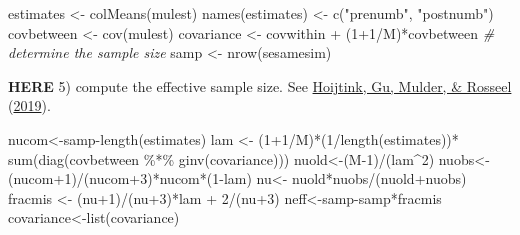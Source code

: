 \documentclass[
]{book}
\newenvironment{Shaded}{\begin{snugshade}}{\end{snugshade}}
\newcommand{\CommentTok}[1]{\textcolor[rgb]{0.56,0.35,0.01}{\textit{#1}}}
\newcommand{\DecValTok}[1]{\textcolor[rgb]{0.00,0.00,0.81}{#1}}
\newcommand{\FunctionTok}[1]{\textcolor[rgb]{0.00,0.00,0.00}{#1}}
\newcommand{\NormalTok}[1]{#1}
\newcommand{\OtherTok}[1]{\textcolor[rgb]{0.56,0.35,0.01}{#1}}
\newcommand{\SpecialCharTok}[1]{\textcolor[rgb]{0.00,0.00,0.00}{#1}}
\newcommand{\StringTok}[1]{\textcolor[rgb]{0.31,0.60,0.02}{#1}}
\begin{document}
\begin{Shaded}
\begin{Highlighting}[]
\NormalTok{estimates }\OtherTok{\textless{}{-}} \FunctionTok{colMeans}\NormalTok{(mulest)}
\FunctionTok{names}\NormalTok{(estimates) }\OtherTok{\textless{}{-}} \FunctionTok{c}\NormalTok{(}\StringTok{"prenumb"}\NormalTok{, }\StringTok{"postnumb"}\NormalTok{)}
\NormalTok{covbetween }\OtherTok{\textless{}{-}} \FunctionTok{cov}\NormalTok{(mulest)}
\NormalTok{covariance }\OtherTok{\textless{}{-}}\NormalTok{ covwithin }\SpecialCharTok{+}\NormalTok{ (}\DecValTok{1}\SpecialCharTok{+}\DecValTok{1}\SpecialCharTok{/}\NormalTok{M)}\SpecialCharTok{*}\NormalTok{covbetween}
\CommentTok{\# determine the sample size}
\NormalTok{samp }\OtherTok{\textless{}{-}} \FunctionTok{nrow}\NormalTok{(sesamesim)}
\end{Highlighting}
\end{Shaded}

\textbf{HERE}
5) compute the effective sample size. See \protect\hyperlink{ref-hoijtink2019computing}{Hoijtink, Gu, Mulder, \& Rosseel} (\protect\hyperlink{ref-hoijtink2019computing}{2019}).

\begin{Shaded}
\begin{Highlighting}[]
\NormalTok{nucom}\OtherTok{\textless{}{-}}\NormalTok{samp}\SpecialCharTok{{-}}\FunctionTok{length}\NormalTok{(estimates)}
\NormalTok{lam }\OtherTok{\textless{}{-}}\NormalTok{ (}\DecValTok{1}\SpecialCharTok{+}\DecValTok{1}\SpecialCharTok{/}\NormalTok{M)}\SpecialCharTok{*}\NormalTok{(}\DecValTok{1}\SpecialCharTok{/}\FunctionTok{length}\NormalTok{(estimates))}\SpecialCharTok{*} \FunctionTok{sum}\NormalTok{(}\FunctionTok{diag}\NormalTok{(covbetween }\SpecialCharTok{\%*\%} \FunctionTok{ginv}\NormalTok{(covariance)))}
\NormalTok{nuold}\OtherTok{\textless{}{-}}\NormalTok{(M}\DecValTok{{-}1}\NormalTok{)}\SpecialCharTok{/}\NormalTok{(lam}\SpecialCharTok{\^{}}\DecValTok{2}\NormalTok{)}
\NormalTok{nuobs}\OtherTok{\textless{}{-}}\NormalTok{(nucom}\SpecialCharTok{+}\DecValTok{1}\NormalTok{)}\SpecialCharTok{/}\NormalTok{(nucom}\SpecialCharTok{+}\DecValTok{3}\NormalTok{)}\SpecialCharTok{*}\NormalTok{nucom}\SpecialCharTok{*}\NormalTok{(}\DecValTok{1}\SpecialCharTok{{-}}\NormalTok{lam)}
\NormalTok{nu}\OtherTok{\textless{}{-}}\NormalTok{ nuold}\SpecialCharTok{*}\NormalTok{nuobs}\SpecialCharTok{/}\NormalTok{(nuold}\SpecialCharTok{+}\NormalTok{nuobs)}
\NormalTok{fracmis }\OtherTok{\textless{}{-}}\NormalTok{ (nu}\SpecialCharTok{+}\DecValTok{1}\NormalTok{)}\SpecialCharTok{/}\NormalTok{(nu}\SpecialCharTok{+}\DecValTok{3}\NormalTok{)}\SpecialCharTok{*}\NormalTok{lam }\SpecialCharTok{+} \DecValTok{2}\SpecialCharTok{/}\NormalTok{(nu}\SpecialCharTok{+}\DecValTok{3}\NormalTok{)}
\NormalTok{neff}\OtherTok{\textless{}{-}}\NormalTok{samp}\SpecialCharTok{{-}}\NormalTok{samp}\SpecialCharTok{*}\NormalTok{fracmis}
\NormalTok{covariance}\OtherTok{\textless{}{-}}\FunctionTok{list}\NormalTok{(covariance)}
\end{Highlighting}
\end{Shaded}
\end{document}
